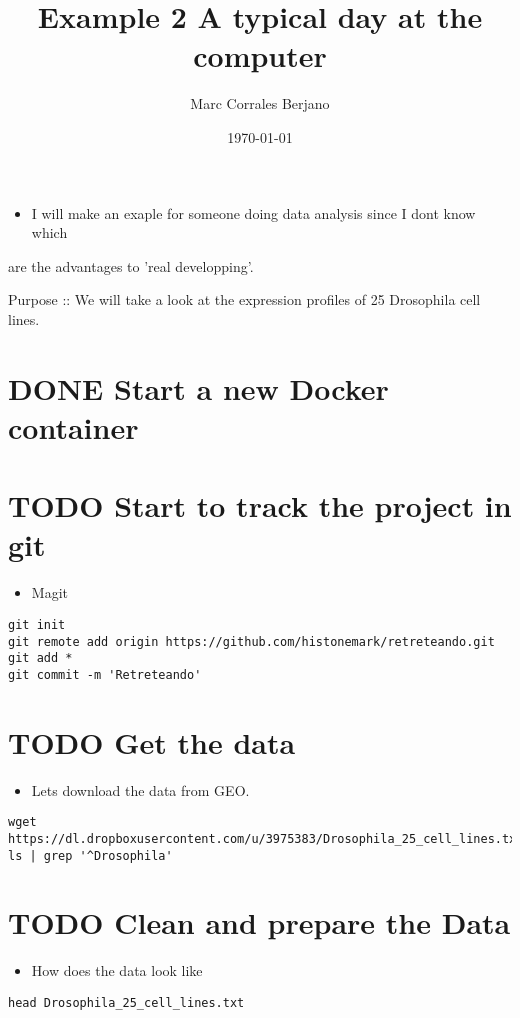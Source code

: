 \documentclass[11pt]{article}
\author{Marc Corrales Berjano}
\date{\today}
\title{Example 2 A typical day at the computer}
\begin{document}
\maketitle
\tableofcontents

\begin{itemize}
\item I will make an exaple for someone doing data analysis since I dont know which
\end{itemize}
are the advantages to 'real developping'.

Purpose :: We will take a look at the expression profiles of 25 Drosophila cell lines.

\section{{\bfseries\sffamily DONE} Start a new Docker container}
\label{sec:org2785f5f}
\section{{\bfseries\sffamily TODO} Start to track the project in git}
\label{sec:org133a7c0}
\begin{itemize}
\item Magit
\end{itemize}
\begin{verbatim}
git init 
git remote add origin https://github.com/histonemark/retreteando.git
git add *
git commit -m 'Retreteando'
\end{verbatim}

\section{{\bfseries\sffamily TODO} Get the data}
\label{sec:orgd258133}
\begin{itemize}
\item Lets download the data from GEO.
\end{itemize}
\begin{verbatim}
wget https://dl.dropboxusercontent.com/u/3975383/Drosophila_25_cell_lines.txt
ls | grep '^Drosophila'
\end{verbatim}

\section{{\bfseries\sffamily TODO} Clean and prepare the Data}
\label{sec:org1ff4c37}

\begin{itemize}
\item How does the data look like
\end{itemize}
\begin{verbatim}
head Drosophila_25_cell_lines.txt
\end{verbatim}
\end{document}
